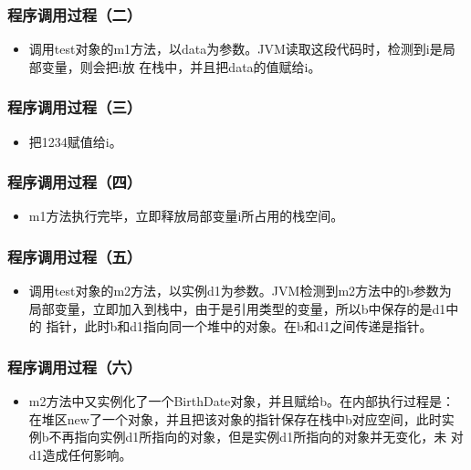 \subsubsection{程序调用过程（二）}

\begin{itemize}
\item 调用test对象的m1方法，以data为参数。JVM读取这段代码时，检测到i是局部变量，则会把i放
  在栈中，并且把data的值赋给i。
\end{itemize}

\subsubsection{程序调用过程（三）}

\begin{itemize}
\item 把1234赋值给i。
\end{itemize}

\subsubsection{程序调用过程（四）}

\begin{itemize}
\item m1方法执行完毕，立即释放局部变量i所占用的栈空间。
\end{itemize}

\subsubsection{程序调用过程（五）}

\begin{itemize}
\item 调用test对象的m2方法，以实例d1为参数。JVM检测到m2方法中的b参数为
  局部变量，立即加入到栈中，由于是引用类型的变量，所以b中保存的是d1中的
  指针，此时b和d1指向同一个堆中的对象。在b和d1之间传递是指针。
\end{itemize}

\subsubsection{程序调用过程（六）}

\begin{itemize}
\item m2方法中又实例化了一个BirthDate对象，并且赋给b。在内部执行过程是：
  在堆区new了一个对象，并且把该对象的指针保存在栈中b对应空间，此时实
  例b不再指向实例d1所指向的对象，但是实例d1所指向的对象并无变化，未
  对d1造成任何影响。
\end{itemize}

